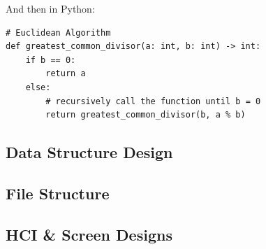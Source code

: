 \documentclass{article}
\begin{document}
And then in Python:


\begin{lstlisting}
# Euclidean Algorithm
def greatest_common_divisor(a: int, b: int) -> int:
    if b == 0:
        return a
    else:
        # recursively call the function until b = 0
        return greatest_common_divisor(b, a % b)
\end{lstlisting}



\subsection{Data Structure Design}
\subsection{File Structure}
\subsection{HCI \& Screen Designs}
\end{document}
